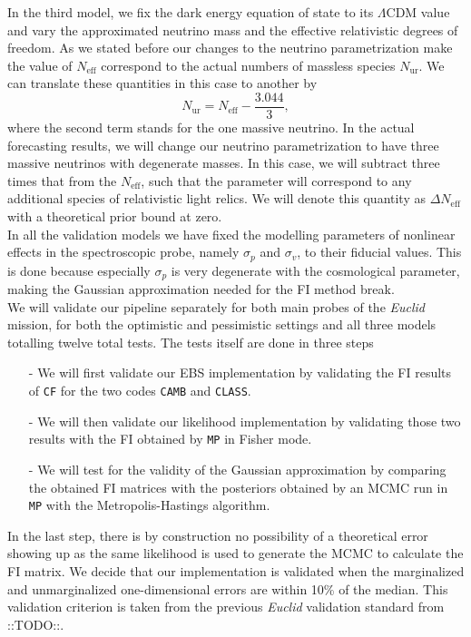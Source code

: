 \documentclass[oneside]{book}
\newcommand*{\Euclid}{\textit{Euclid}\xspace}
\newcommand*{\marktodo}{{\color{mmcol} ::TODO::}\xspace}
\newcommand*{\montepython}{\texttt{MP}\xspace}
\newcommand*{\cosmicfish}{\texttt{CF}\xspace}
\newcommand*{\class}{{\tt CLASS}\xspace}
\newcommand*{\camb}{{\tt CAMB}\xspace}
\newcommand*{\neff}{N_\mathrm{eff}}
\begin{document}
In the third model, we fix the dark energy equation of state to its $\Lambda$CDM value and vary the approximated neutrino mass and the effective relativistic degrees of freedom. As we stated before our changes to the neutrino parametrization make the value of $\neff$ correspond to the actual numbers of massless species $N_\mathrm{ur}$. We can translate these quantities in this case to another by \begin{equation}
    N_\mathrm{ur} = \neff - \frac{3.044}{3},
\end{equation}
where the second term stands for the one massive neutrino. In the actual forecasting results, we will change our neutrino parametrization to have three massive neutrinos with degenerate masses. In this case, we will subtract three times that from the $\neff$, such that the parameter will correspond to any additional species of relativistic light relics. We will denote this quantity as $\Delta \neff$ with a theoretical prior bound at zero.\\
In all the validation models we have fixed the modelling parameters of nonlinear effects in the spectroscopic probe, namely $\sigma_p$ and $\sigma_v$, to their fiducial values. This is done because especially $\sigma_p$ is very degenerate with the cosmological parameter, making the Gaussian approximation needed for the FI method break.\\
We will validate our pipeline separately for both main probes of the \Euclid mission, for both the optimistic and pessimistic settings and all three models totalling twelve total tests. The tests itself are done in three steps \begin{itemize}
    \item[-] We will first validate our EBS implementation by validating the FI results of \cosmicfish for the two codes \camb and \class.
    \item[-] We will then validate our likelihood implementation by validating those two results with the FI obtained by \montepython in Fisher mode.
    \item[-] We will test for the validity of the Gaussian approximation by comparing the obtained FI matrices with the posteriors obtained by an MCMC run in \montepython with the Metropolis-Hastings algorithm.    
\end{itemize}
In the last step, there is by construction no possibility of a theoretical error showing up as the same likelihood is used to generate the MCMC to calculate the FI matrix. We decide that our implementation is validated when the marginalized and unmarginalized one-dimensional errors are within 10\% of the median. This validation criterion is taken from the previous \Euclid validation standard from \marktodo.\\
\end{document}

